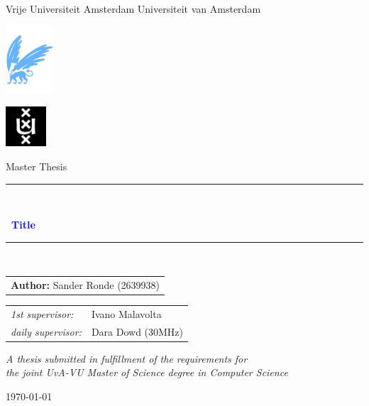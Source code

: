 \documentclass[oneside,11pt]{lib/PhDthesisPSnPDF}
\newcommand{\todo}[1]{\textcolor{blue}{\ding{46}~#1}}
\begin{document}
\thispagestyle{empty}

\begin{center}

	Vrije Universiteit Amsterdam \hspace*{2cm} Universiteit van Amsterdam

	\vspace{1mm}

	\hspace*{-7.5cm}\includegraphics[height=25mm]{figures/front/vu-griffioen.pdf}

	\vspace*{-2cm}\hspace*{7.5cm}\includegraphics[height=15mm]{figures/front/uva_logo.jpg}

	\vspace{2cm}

	{\Large Master Thesis}

	\vspace*{1.5cm}

	\rule{.9\linewidth}{.6pt}\\[0.4cm]
	{\huge \bfseries \todo{Title} \par}\vspace{0.4cm}
	\rule{.9\linewidth}{.6pt}\\[1.5cm]

	\vspace*{2mm}

	{\Large
		\begin{tabular}{l}
			{\bf Author:} Sander Ronde (2639938)
		\end{tabular}
	}

	\vspace*{2cm}

	\begin{tabular}{ll}
		{\it 1st supervisor:}   & Ivano Malavolta   \\
		{\it daily supervisor:} & Dara Dowd (30MHz) \\
	\end{tabular}

	\vspace*{2.5cm}

	\textit{A thesis submitted in fulfillment of the requirements for\\ the joint UvA-VU Master of Science degree in Computer Science}

	\vspace*{1.8cm}

	\today\\[4cm] %

\end{center}
\end{document}

